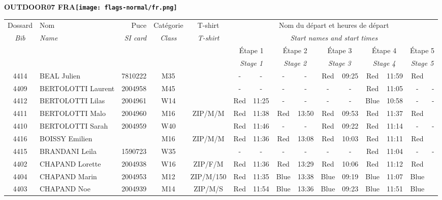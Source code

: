 \documentclass{report}
\begin{document}
\newpage
  \Huge \centering \bfseries OUTDOOR07  FRA\normalfont \footnotesize \sffamily \hfill \texttt{[image: flags-normal/fr.png]} \newline 
  \begin{longtable}{|c|l|r|c|c|*{5}{cc|}}
    Dossard & Nom  & Puce    & Catégorie & T-shirt & \multicolumn{10}{c|}{Nom du départ et heures de départ} \\
    \itshape Bib     & \itshape Name & \itshape SI card & \itshape Class  & \itshape  T-shirt  & \multicolumn{10}{c|}{\itshape Start names and start times} \\
    \hline
    & & & & & \multicolumn{2}{c|}{Étape 1} & \multicolumn{2}{c|}{Étape 2} & \multicolumn{2}{c|}{Étape 3} & \multicolumn{2}{c|}{Étape 4} & \multicolumn{2}{c|}{Étape 5} \\
    & & & & & \multicolumn{2}{c|}{\itshape Stage 1} & \multicolumn{2}{c|}{\itshape Stage 2} & \multicolumn{2}{c|}{\itshape Stage 3} & \multicolumn{2}{c|}{\itshape Stage 4} & \multicolumn{2}{c|}{\itshape Stage 5} \\
    \hline
    4414 & BEAL Julien & 7810222 & M35 &   & - &  - & - &  - & Red & 09:25 & Red & 11:59 & Red &  \\
    4409 & BERTOLOTTI Laurent & 2004958 & M45 &   & - &  - & - &  - & - &  - & Red & 11:05 & - &  -\\
    4412 & BERTOLOTTI Lilas & 2004961 & W14 &   & Red & 11:25 & - &  - & - &  - & Blue & 10:58 & - &  -\\
    4411 & BERTOLOTTI Malo & 2004960 & M16 & ZIP/M/M & Red & 11:38 & Red & 13:50 & Red & 09:53 & Red & 11:37 & Red &  \\
    4410 & BERTOLOTTI Sarah & 2004959 & W40 &   & Red & 11:46 & - &  - & Red & 09:22 & Red & 11:14 & - &  -\\
    4416 & BOISSY Emilien &  & M16 & ZIP/M/M & Red & 11:36 & Red & 13:08 & Red & 10:03 & Red & 11:11 & Red &  \\
    4415 & BRANDANI Leila & 1590723 & W35 &   & - &  - & - &  - & - &  - & Red & 11:04 & - &  -\\
    4402 & CHAPAND Lorette & 2004938 & W16 & ZIP/F/M & Red & 11:36 & Red & 13:29 & Red & 10:06 & Red & 11:12 & Red &  \\
    4404 & CHAPAND Marin & 2004953 & M12 & ZIP/M/150 & Red & 11:35 & Blue & 13:38 & Blue & 09:19 & Blue & 11:07 & Blue &  \\
    4403 & CHAPAND Noe & 2004939 & M14 & ZIP/M/S & Red & 11:54 & Blue & 13:36 & Blue & 09:23 & Blue & 11:51 & Blue &  \\

\end{longtable}
\end{document}
